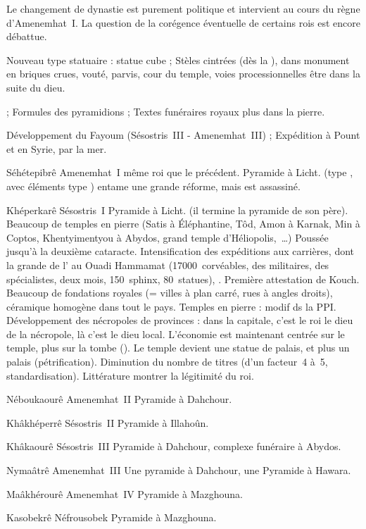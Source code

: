 
Le changement de dynastie est purement politique et intervient 
au cours du règne d'Amenemhat~I\ier. La question de la corégence 
éventuelle de certains rois est encore débattue.

Nouveau type statuaire : statue cube ;
Stèles cintrées (dès la \PPI), dans monument en briques crues, vouté, 
parvis, cour du temple, voies processionnelles \donc{} être dans la 
suite du dieu.

\TS ;
Formules des pyramidions ;
Textes funéraires royaux plus dans la pierre.

Développement du Fayoum (Sésostris~III - Amenemhat~III) ; 
Expédition à Pount et en Syrie, par la mer.

\noi{} 

\begin{listerois}
  \item [Séhétepibrê Amenemhat~I] même roi que le précédent. 
        Pyramide à Licht. (type , avec éléments type )
        entame une grande réforme, mais est assassiné.
  \item [Khéperkarê Sésostris~I] Pyramide à Licht. (il termine la 
        pyramide de son père). Beaucoup de temples en pierre (Satis à 
        Éléphantine, Tôd, Amon à Karnak, Min à Coptos, Khentyimentyou 
        à Abydos, grand temple d'Héliopolis,~\dots) Poussée jusqu'à la 
        deuxième cataracte.
        Intensification des expéditions aux carrières, dont la grande 
        de l' au Ouadi Hammamat (\num{17000}~corvéables, des 
        militaires, des spécialistes, deux mois, \num{150}~sphinx, 
        \num{80}~statues), \SeK.
        Première attestation de Kouch.
        Beaucoup de fondations royales (= villes à plan carré, rues à 
        angles droits), céramique homogène dans tout le pays. Temples 
        en pierre : modif ds la PPI. Développement des nécropoles de 
        provinces : dans la capitale, c'est le roi le dieu de la 
        nécropole, là c'est le dieu local. L'économie est maintenant 
        centrée sur le temple, plus sur la tombe ().
        Le temple devient une statue de palais, et plus un palais 
        (pétrification).
        Diminution du nombre de titres (d'un facteur~\num{4} 
        à~\num{5}, standardisation).
        Littérature \donc{} montrer la légitimité du roi.
  \item [Néboukaourê Amenemhat~II] Pyramide à Dahchour.
  \item [Khâkhéperrê Sésostris~II] Pyramide à Illahoûn.
  \item [Khâkaourê Sésostris~III] Pyramide à Dahchour, complexe 
        funéraire à Abydos.
  \item [Nymaâtrê Amenemhat~III] Une pyramide à Dahchour, une 
        Pyramide à Hawara.
  \item [Maâkhérourê Amenemhat~IV] Pyramide à Mazghouna.
  \item [Kasobekrê Néfrousobek] Pyramide à Mazghouna.
\end{listerois}

